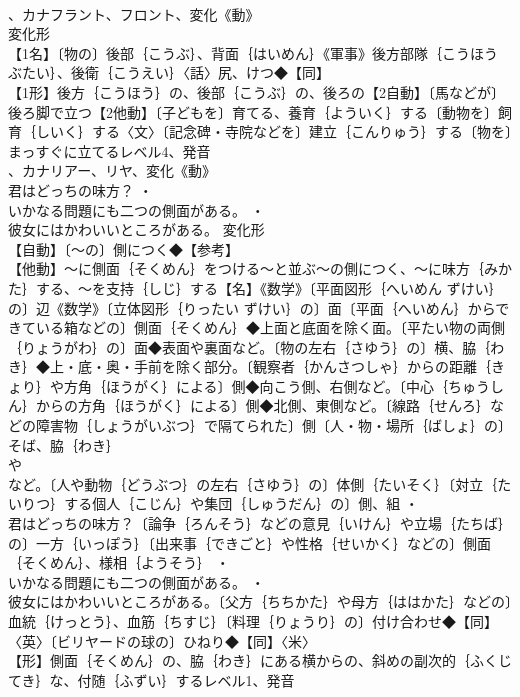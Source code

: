 \documentclass[8pt]{extreport}
\begin{document}
\begin{CJK}{UTF8}{min}
\\	、カナフラント、フロント、変化《動》
\\	変化形 
\\	【1名】〔物の〕後部｛こうぶ｝、背面｛はいめん｝《軍事》後方部隊｛こうほう ぶたい｝、後衛｛こうえい｝〈話〉尻、けつ◆【同】
\\	【1形】後方｛こうほう｝の、後部｛こうぶ｝の、後ろの【2自動】〔馬などが〕後ろ脚で立つ【2他動】〔子どもを〕育てる、養育｛よういく｝する〔動物を〕飼育｛しいく｝する〈文〉〔記念碑・寺院などを〕建立｛こんりゅう｝する〔物を〕まっすぐに立てるレベル4、発音
\\	、カナリアー、リヤ、変化《動》
\\	君はどっちの味方？ ・
\\	いかなる問題にも二つの側面がある。 ・
\\	彼女にはかわいいところがある。	変化形 
\\	【自動】〔～の〕側につく◆【参考】
\\	【他動】～に側面｛そくめん｝をつける～と並ぶ～の側につく、～に味方｛みかた｝する、～を支持｛しじ｝する【名】《数学》〔平面図形｛へいめん ずけい｝の〕辺《数学》〔立体図形｛りったい ずけい｝の〕面〔平面｛へいめん｝からできている箱などの〕側面｛そくめん｝◆上面と底面を除く面。〔平たい物の両側｛りょうがわ｝の〕面◆表面や裏面など。〔物の左右｛さゆう｝の〕横、脇｛わき｝◆上・底・奥・手前を除く部分。〔観察者｛かんさつしゃ｝からの距離｛きょり｝や方角｛ほうがく｝による〕側◆向こう側、右側など。〔中心｛ちゅうしん｝からの方角｛ほうがく｝による〕側◆北側、東側など。〔線路｛せんろ｝などの障害物｛しょうがいぶつ｝で隔てられた〕側〔人・物・場所｛ばしょ｝の〕そば、脇｛わき｝
\\	や
\\	など。〔人や動物｛どうぶつ｝の左右｛さゆう｝の〕体側｛たいそく｝〔対立｛たいりつ｝する個人｛こじん｝や集団｛しゅうだん｝の〕側、組 ・
\\	君はどっちの味方？〔論争｛ろんそう｝などの意見｛いけん｝や立場｛たちば｝の〕一方｛いっぽう｝〔出来事｛できごと｝や性格｛せいかく｝などの〕側面｛そくめん｝、様相｛ようそう｝ ・
\\	いかなる問題にも二つの側面がある。 ・
\\	彼女にはかわいいところがある。〔父方｛ちちかた｝や母方｛ははかた｝などの〕血統｛けっとう｝、血筋｛ちすじ｝〔料理｛りょうり｝の〕付け合わせ◆【同】
\\	〈英〉〔ビリヤードの球の〕ひねり◆【同】〈米〉
\\	【形】側面｛そくめん｝の、脇｛わき｝にある横からの、斜めの副次的｛ふくじ てき｝な、付随｛ふずい｝するレベル1、発音

\end{CJK}
\end{document}
